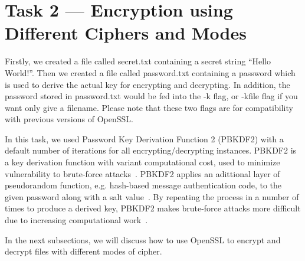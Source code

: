 \section{Task 2 --- Encryption using Different Ciphers and Modes}
%
Firstly, we created a file called {\selectfont secret.txt}
containing a secret string ``Hello World!''. Then we created a file
called {\selectfont password.txt} containing a password
which is used to derive the actual key for encrypting and
decrypting. In addition, the password stored in {\selectfont password.txt}
would be fed into the {\selectfont -k flag}, or
{\selectfont -kfile flag} if you want only give a filename.
Please note that these two flags are for compatibility with previous versions
of OpenSSL.

In this task, we used Password Key Derivation Function 2 (PBKDF2) with a default number
of iterations for all encrypting/decrypting instances. PBKDF2 is a key
derivation function with variant computational cost,
used to minimize vulnerability to brute-force attacks~\cite{pbkdf2}. PBKDF2 applies
an adittional layer of pseudorandom function, e.g. hash-based message authentication
code, to the given password along with a salt value~\cite{pbkdf2}. By repeating the
process in a number of times to produce a derived key, PBKDF2 makes brute-force attacks
more difficult due to increasing computational work~\cite{pbkdf2}.

In the next subsections, we will discuss how to use OpenSSL to encrypt
and decrypt files with different modes of cipher.

